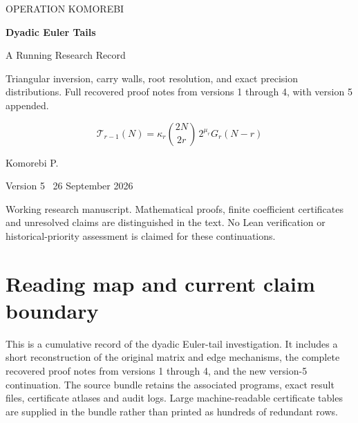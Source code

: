 \documentclass[11pt,letterpaper]{article}
\begin{document}
\hypersetup{pageanchor=false}
\begin{titlepage}
\thispagestyle{empty}
\vspace*{0.65in}
{\sffamily\large OPERATION KOMOREBI\par}
\vspace{0.55in}
{\sffamily\fontsize{31}{36}\selectfont\bfseries Dyadic Euler Tails\par}
\vspace{0.20in}
{\sffamily\fontsize{20}{25}\selectfont A Running Research Record\par}
\vspace{0.38in}
{\large Triangular inversion, carry walls, root resolution, and exact precision distributions. Full recovered proof notes from versions 1 through 4, with version 5 appended.\par}
\vspace{0.45in}
\[
\mathcal T_{r-1}(N)
=\kappa_r\binom{2N}{2r}\,2^{\mu_r}G_r(N-r)
\]
\vfill
{\large Komorebi P.\par}
\vspace{0.14in}
{\sffamily Version 5 \textbar\ 26 September 2026\par}
\vspace{0.35in}
\begin{minipage}{0.94\textwidth}
\small
Working research manuscript. Mathematical proofs, finite coefficient certificates and unresolved claims are distinguished in the text. No Lean verification or historical-priority assessment is claimed for these continuations.
\end{minipage}
\end{titlepage}
\hypersetup{pageanchor=true}
\tableofcontents
\clearpage
{}
\section{Reading map and current claim boundary}\label{reading-map-and-current-claim-boundary}

This is a cumulative record of the dyadic Euler-tail investigation. It includes a short reconstruction of the original matrix and edge mechanisms, the complete recovered proof notes from versions 1 through 4, and the new version-5 continuation. The source bundle retains the associated programs, exact result files, certificate atlases and audit logs. Large machine-readable certificate tables are supplied in the bundle rather than printed as hundreds of redundant rows.
\end{document}
